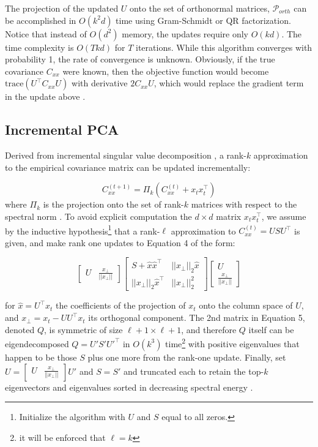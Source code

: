 \documentclass[11pt,letterpaper]{article}
\begin{document}
The projection of the updated $U$ onto the set of orthonormal matrices, $\mathcal{P}_{orth}$ can be accomplished in $O(k^2d)$ time using Gram-Schmidt or QR factorization. Notice that instead of $O(d^2)$ memory, the updates require only $O(kd)$. The time complexity is $O(Tkd)$ for $T$ iterations. While this algorithm converges with probability 1, the rate of convergence is unknown. Obviously, if the true covariance $C_{xx}$ were known, then the objective function would become $\text{trace}\left(U^{\top}C_{xx}U\right)$ with derivative $2C_{xx}U$, which would replace the gradient term in the update above \cite{arora1}.

\subsection{Incremental PCA}
Derived from incremental singular value decomposition \cite{brand}, a rank-$k$ approximation to the empirical covariance matrix can be updated incrementally:

\begin{equation}
C_{xx}^{(t + 1)} = \Pi_k \left(C_{xx}^{(t)} + x_tx_t^{\top}\right)
\end{equation}
where $\Pi_k$ is the projection onto the set of rank-$k$ matrices with respect to the spectral norm \cite{arora1}. To avoid explicit computation the $d \times d$ matrix $x_tx_t^{\top}$, we assume by the inductive hypothesis\footnote{Initialize the algorithm with $U$ and $S$ equal to all zeros.} that a rank-$\ell$ approximation to $C_{xx}^{(t)} = USU^{\top}$ is given, and make rank one updates to Equation 4 of the form: 

\begin{equation}
\begin{bmatrix} U & \frac{x_{\perp}}{||x_{\perp}||} \end{bmatrix}  \begin{bmatrix} 
S + \hat{x}\hat{x}^{\top} & ||x_{\perp}||_2 \hat{x} \\
||x_{\perp}||_2 \hat{x}^{\top} & ||x_{\perp}||_2^2 \end{bmatrix}
\begin{bmatrix} U \\
 \frac{x_{\perp}}{||x_{\perp}||} \end{bmatrix}
\end{equation}

for $\hat{x} = U^{\top}x_t$ the coefficients of the projection of $x_t$ onto the column space of $U$, and $x_{\perp} = x_t - UU^{\top}x_t$ its orthogonal component. The 2nd matrix in Equation 5, denoted $Q$, is symmetric of size $\ell + 1 \times \ell +1$, and therefore $Q$ itself can be eigendecomposed $Q = U'S'U'^{\top}$ in $O(k^3)$ time\footnote{it will be enforced that $\ell = k$} with positive eigenvalues that happen to be those $S$ plus one more from the rank-one update. Finally, set $U = \begin{bmatrix} U & \frac{x_{\perp}}{||x_{\perp}||} \end{bmatrix} U'$ and $S = S'$ and truncated each to retain the top-$k$ eigenvectors and eigenvalues sorted in decreasing spectral energy \cite{arora1}. 
\end{document}
